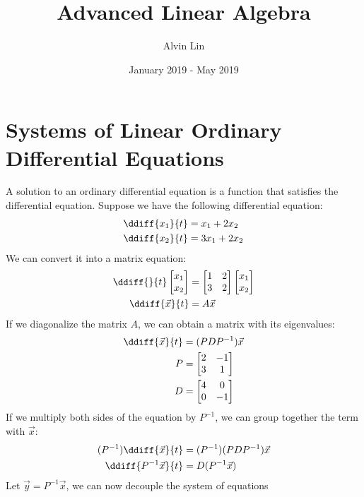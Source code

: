 \documentclass{math}
\title{Advanced Linear Algebra}
\author{Alvin Lin}
\date{January 2019 - May 2019}
\begin{document}
\maketitle

\section*{Systems of Linear Ordinary Differential Equations}
A solution to an ordinary differential equation is a function that satisfies
the differential equation. Suppose we have the following differential equation:
\begin{align*}
  \ddiff{x_1}{t} &= x_1+2x_2 \\
  \ddiff{x_2}{t} &= 3x_1+2x_2
\end{align*}
We can convert it into a matrix equation:
\begin{align*}
  \ddiff{}{t}\begin{bmatrix}x_1 \\ x_2\end{bmatrix} &= \begin{bmatrix}
    1 & 2 \\
    3 & 2
  \end{bmatrix}\begin{bmatrix}x_1 \\ x_2\end{bmatrix} \\
  \ddiff{\vec{x}}{t} &= A\vec{x}
\end{align*}
If we diagonalize the matrix \( A \), we can obtain a matrix with its
eigenvalues:
\begin{align*}
  \ddiff{\vec{x}}{t} &= (PDP^{-1})\vec{x} \\
  P &= \begin{bmatrix}
    2 & -1 \\
    3 & 1
  \end{bmatrix} \\
  D &= \begin{bmatrix}
    4 & 0 \\
    0 & -1
  \end{bmatrix}
\end{align*}
If we multiply both sides of the equation by \( P^{-1} \), we can group together
the term with \( \vec{x} \):
\begin{align*}
  (P^{-1})\ddiff{\vec{x}}{t} &= (P^{-1})(PDP^{-1})\vec{x} \\
  \ddiff{P^{-1}\vec{x}}{t} &= D(P^{-1}\vec{x})
\end{align*}
Let \( \vec{y} = P^{-1}\vec{x} \), we can now decouple the system of equations
\end{document}
